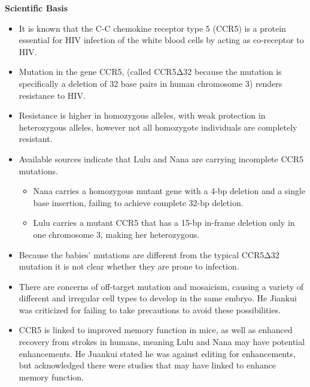 \documentclass[plain,basic]{inVerba-notes}
\begin{document}
    \textbf{\large Scientific Basis}
    \begin{itemize}
        \item It is known that the C-C chemokine receptor type 5 (CCR5) is a protein essential for HIV infection of the white blood cells by acting as co-receptor to HIV\@.
        \item Mutation in the gene CCR5, (called CCR5Δ32 because the mutation is specifically a deletion of 32 base pairs in human chromosome 3) renders resistance to HIV\@. 
        \item Resistance is higher in homozygous alleles, with weak protection in heterozygous alleles, however not all homozygote individuals are completely resistant. 
        \item Available sources indicate that Lulu and Nana are carrying incomplete CCR5 mutations.
            \begin{itemize}
                \item Nana carries a homozygous mutant gene with a 4-bp deletion and a single base insertion, failing to achieve complete 32-bp deletion.
                \item Lulu carries a mutant CCR5 that has a 15-bp in-frame deletion only in one chromosome 3, making her heterozygous. 
            \end{itemize}
        \item Because the babies' mutations are different from the typical CCR5Δ32 mutation it is not clear whether they are prone to infection.
        \item There are concerns of off-target mutation and mosaicism, causing a variety of different and irregular cell types to develop in the same embryo. He Jiankui was criticized for failing to take precautions to avoid these possibilities.
        \item CCR5 is linked to improved memory function in mice, as well as enhanced recovery from strokes in humans, meaning Lulu and Nana may have potential enhancements. He Juankui stated he was against editing for enhancements, but acknowledged there were studies that may have linked to enhance memory function. 
    \end{itemize}

    \nocite*{}
    
    
\end{document}
